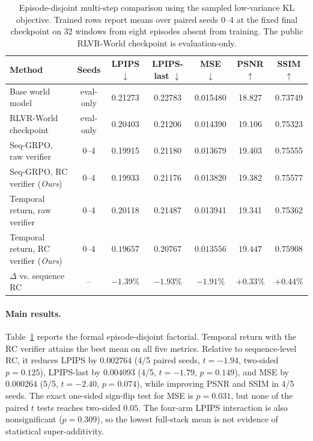 \documentclass[letterpaper]{article} %
\begin{document}
\begin{table}[t]
\centering
\caption{Episode-disjoint multi-step comparison using the sampled low-variance KL objective. Trained rows report means over paired seeds 0--4 at the fixed final checkpoint on 32 windows from eight episodes absent from training. The public RLVR-World checkpoint is evaluation-only.}
\label{tab:main_multistep}
\small
\setlength{\tabcolsep}{4pt}
\begin{tabular}{lcccccc}
\toprule
Method & Seeds & LPIPS $\downarrow$ & LPIPS-last $\downarrow$ & MSE $\downarrow$ & PSNR $\uparrow$ & SSIM $\uparrow$ \\
 \midrule
Base world model & eval-only & 0.21273 & 0.22783 & 0.015480 & 18.827 & 0.73749 \\
RLVR-World checkpoint & eval-only & 0.20403 & 0.21206 & 0.014390 & 19.106 & 0.75323 \\
Seq-GRPO, raw verifier & 0--4 & 0.19915 & 0.21180 & 0.013679 & 19.403 & 0.75555 \\
\midrule
Seq-GRPO, RC verifier (\emph{Ours}) & 0--4 & 0.19933 & 0.21176 & 0.013820 & 19.382 & 0.75577 \\
Temporal return, raw verifier & 0--4 & 0.20118 & 0.21487 & 0.013941 & 19.341 & 0.75362 \\
Temporal return, RC verifier (\emph{Ours}) & 0--4 & $\mathbf{0.19657}$ & $\mathbf{0.20767}$ & $\mathbf{0.013556}$ & $\mathbf{19.447}$ & $\mathbf{0.75908}$ \\
\midrule
$\Delta$ vs. sequence RC & -- & $\mathbf{-1.39\%}$ & $\mathbf{-1.93\%}$ & $\mathbf{-1.91\%}$ & $\mathbf{+0.33\%}$ & $\mathbf{+0.44\%}$ \\
\bottomrule
\end{tabular}
\end{table}

\paragraph{Main results.}
Table~\ref{tab:main_multistep} reports the formal episode-disjoint factorial. Temporal return with the RC verifier attains the best mean on all five metrics. Relative to sequence-level RC, it reduces LPIPS by $0.002764$ (4/5 paired seeds, $t=-1.94$, two-sided $p=0.125$), LPIPS-last by $0.004093$ (4/5, $t=-1.79$, $p=0.149$), and MSE by $0.000264$ (5/5, $t=-2.40$, $p=0.074$), while improving PSNR and SSIM in 4/5 seeds. The exact one-sided sign-flip test for MSE is $p=0.031$, but none of the paired $t$ tests reaches two-sided $0.05$. The four-arm LPIPS interaction is also nonsignificant ($p=0.309$), so the lowest full-stack mean is not evidence of statistical super-additivity.
\end{document}
